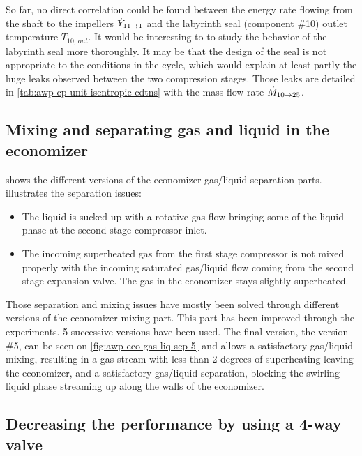 So far, no direct correlation could be found between the energy rate
flowing from the shaft to the impellers $\dot{Y}_{11 \rightarrow 1}$ and the
labyrinth seal (component \#10) outlet temperature $T_{10,\,out}$. It
would be interesting to to study the behavior of the labyrinth seal
more thoroughly. It may be that the design of the seal is not
appropriate to the conditions in the cycle, which would explain at
least partly the huge leaks observed between the two compression
stages. Those leaks are detailed in
\cref{tab:awp-cp-unit-isentropic-cdtns} with the mass flow rate
$\dot{M}_{10 \rightarrow 25}$.

\subsection{Mixing and separating gas and liquid in the
  economizer}
\label{sec:awp-issue-eco-separation}

 shows the different versions of
the economizer gas/liquid separation
parts.  illustrates the separation
issues:

\begin{itemize}
\item The liquid is sucked up with a rotative gas flow bringing some
  of the liquid phase at the second stage compressor inlet.
\item The incoming superheated gas from the first stage compressor is
  not mixed properly with the incoming saturated gas/liquid flow
  coming from the second stage expansion valve. The gas in the
  economizer stays slightly superheated.
\end{itemize}

Those separation and mixing issues have mostly been solved through
different versions of the economizer mixing part. This part has been
improved through the experiments. 5 successive versions have been
used. The final version, the version \#5, can be seen on
\cref{fig:awp-eco-gas-liq-sep-5} and allows a satisfactory gas/liquid
mixing, resulting in a gas stream with less than 2 degrees of
superheating leaving the economizer, and a satisfactory gas/liquid
separation, blocking the swirling liquid phase streaming up along the
walls of the economizer.

\subsection{Decreasing the performance by using a
  4-way valve}
\label{sec:awp-issue-4way}


